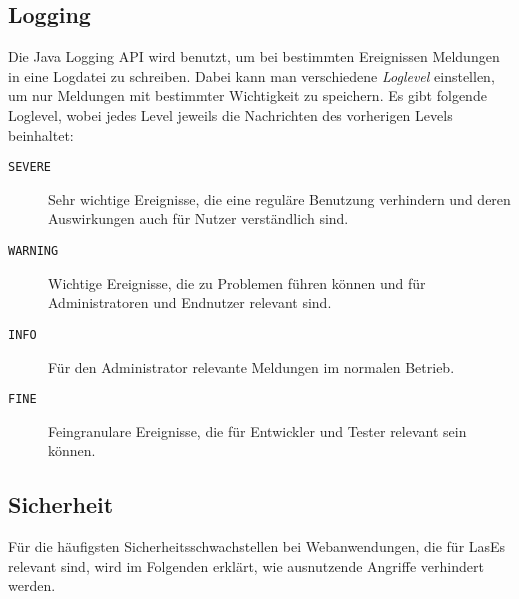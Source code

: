 
\subsection{Logging}\label{subsec:logging}
Die Java Logging API wird benutzt, um bei bestimmten Ereignissen Meldungen in eine Logdatei zu schreiben.
Dabei kann man verschiedene \emph{Loglevel} einstellen, um nur Meldungen mit bestimmter Wichtigkeit zu speichern.
Es gibt folgende Loglevel, wobei jedes Level jeweils die Nachrichten des vorherigen Levels beinhaltet:
\begin{description}
    \item[\texttt{SEVERE}] Sehr wichtige Ereignisse, die eine reguläre Benutzung verhindern und deren Auswirkungen auch für Nutzer verständlich sind.
    \item[\texttt{WARNING}] Wichtige Ereignisse, die zu Problemen führen können und für Administratoren und Endnutzer relevant sind.
    \item[\texttt{INFO}] Für den Administrator relevante Meldungen im normalen Betrieb.
    \item[\texttt{FINE}] Feingranulare Ereignisse, die für Entwickler und Tester relevant sein können.
\end{description}

\subsection{Sicherheit}\label{subsec:sicherheit}
Für die häufigsten Sicherheitsschwachstellen bei Webanwendungen, die für LasEs relevant sind, wird im Folgenden erklärt, wie ausnutzende Angriffe verhindert werden.


